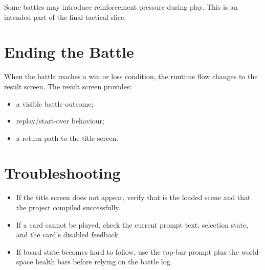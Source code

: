 Some battles may introduce reinforcement pressure during play. This is an intended part of the final tactical slice.

\section{Ending the Battle}

When the battle reaches a win or loss condition, the runtime flow changes to the result screen. The result screen provides:

\begin{itemize}
    \item a visible battle outcome;
    \item replay/start-over behaviour;
    \item a return path to the title screen.
\end{itemize}

\section{Troubleshooting}

\begin{itemize}
    \item If the title screen does not appear, verify that  is the loaded scene and that the project compiled successfully.
    \item If a card cannot be played, check the current prompt text, selection state, and the card's disabled feedback.
    \item If board state becomes hard to follow, use the top-bar prompt plus the world-space health bars before relying on the battle log.
\end{itemize}
